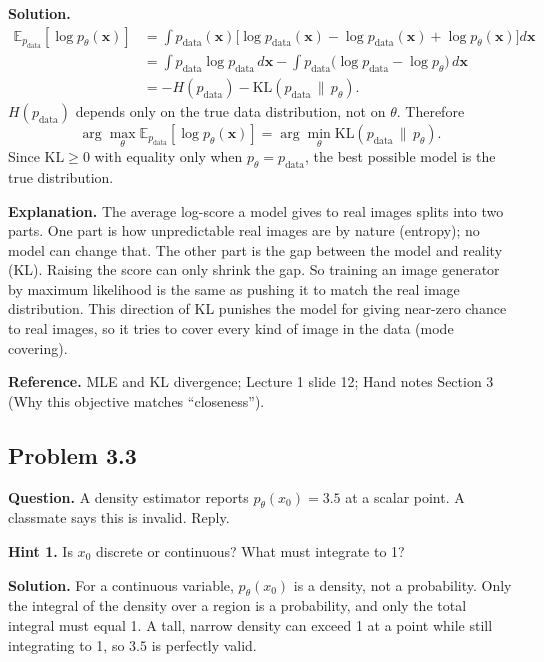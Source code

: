 \documentclass[11pt]{article}
\begin{document}
\textbf{Solution.}
\[
\begin{aligned}
\mathbb{E}_{p_{\text{data}}}[\log p_\theta(\mathbf{x})]
&= \int p_{\text{data}}(\mathbf{x})\Big[\log p_{\text{data}}(\mathbf{x}) - \log p_{\text{data}}(\mathbf{x}) + \log p_\theta(\mathbf{x})\Big]d\mathbf{x} \\
&= \int p_{\text{data}}\log p_{\text{data}}\,d\mathbf{x} - \int p_{\text{data}}\big(\log p_{\text{data}} - \log p_\theta\big)\,d\mathbf{x} \\
&= -H(p_{\text{data}}) - \mathrm{KL}(p_{\text{data}}\,\|\,p_\theta).
\end{aligned}
\]
$H(p_{\text{data}})$ depends only on the true data distribution, not on $\theta$. Therefore
\[
\arg\max_\theta \mathbb{E}_{p_{\text{data}}}[\log p_\theta(\mathbf{x})] = \arg\min_\theta \mathrm{KL}(p_{\text{data}}\,\|\,p_\theta).
\]
Since $\mathrm{KL}\ge 0$ with equality only when $p_\theta = p_{\text{data}}$, the best possible model is the true distribution.

\textbf{Explanation.} The average log-score a model gives to real images splits into two parts. One part is how unpredictable real images are by nature (entropy); no model can change that. The other part is the gap between the model and reality (KL). Raising the score can only shrink the gap. So training an image generator by maximum likelihood is the same as pushing it to match the real image distribution. This direction of KL punishes the model for giving near-zero chance to real images, so it tries to cover every kind of image in the data (mode covering).

\textbf{Reference.} MLE and KL divergence; Lecture 1 slide 12; Hand notes Section 3 (Why this objective matches ``closeness'').

\subsection*{Problem 3.3}
\textbf{Question.} A density estimator reports $p_\theta(x_0)=3.5$ at a scalar point. A classmate says this is invalid. Reply.

\textbf{Hint 1.} Is $x_0$ discrete or continuous? What must integrate to 1?

\textbf{Solution.} For a continuous variable, $p_\theta(x_0)$ is a density, not a probability. Only the integral of the density over a region is a probability, and only the total integral must equal 1. A tall, narrow density can exceed 1 at a point while still integrating to 1, so $3.5$ is perfectly valid.
\end{document}
